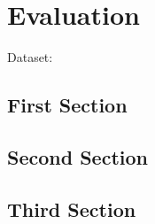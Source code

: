 
\chapter{Evaluation}
\label{ch:Evaluation}
Dataset: \cite{sperber2024evaluating}

\section{First Section}
\label{sec:Evaluation:FirstSection}


\section{Second Section}
\label{sec:Evaluation:SecondSection}

\section{Third Section}
\label{sec:Evaluation:ThirdSection}


